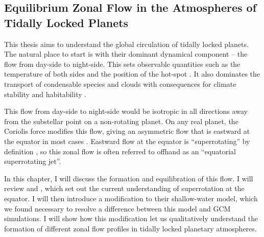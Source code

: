 \begin{SingleSpace}
\chapter{Equilibrium Zonal Flow in the Atmospheres of Tidally Locked Planets}\label{ch:eqm-zonal-flow}
\vspace{0.5cm}
\end{SingleSpace}
\vspace{0.5cm}


This thesis aims to understand the global circulation of tidally locked planets. The natural place to start is with their dominant dynamical component -- the flow from day-side to night-side. This sets observable quantities such as the  temperature of both sides and the position of the hot-spot \citep{pierrehumbert2018review}. It also dominates the transport of condensable species and clouds with consequences for climate stability and habitability \citep{ding2016convection} \citep{pierrehumbert2016dynamics} \citep{komacek2019atmospheric}.


This flow from day-side to night-side would be isotropic in all directions away from the substellar point on a non-rotating planet. On any real planet, the Coriolis force modifies this flow, giving an asymmetric flow that is eastward at the equator in most cases \citep{showman2011superrotation}. Eastward flow at the equator is ``superrotating'' by definition \citep{read2018superrotation}, so this zonal flow is often referred to offhand as an ``equatorial superrotating jet''.


In this chapter, I will discuss the formation and equilibration of this flow. I will review \citet{showman2010superrotation} and \citet{showman2011superrotation}, which set out the current understanding of superrotation at the equator. I will then introduce a modification to their shallow-water model, which we found necessary to resolve a difference between this model and GCM simulations. I will show how this modification let us qualitatively understand the formation of different zonal flow profiles in tidally locked planetary atmospheres.

